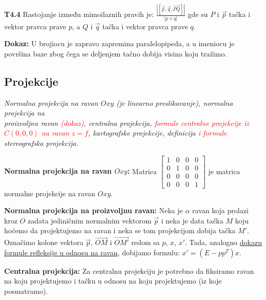 \documentclass[12pt]{article}
\newcommand{\vek}[1]{\overrightarrow{#1}}
\newcommand{\ocena}[1]{\textcolor{red}{#1}}
\begin{document}
\textbf{T4.4} Rastojanje između mimoilaznih pravih je:
$\frac{|[\vek{p},\vek{q},\vek{PQ}]|}{|p\times q|}$ gde su $P$ i $\vek{p}$ tačka
i vektor pravca prave $p$, a $Q$ i $\vek{q}$ tačka i vektor pravca prave $q$.
\par
\textbf{Dokaz:} U brojiocu je zapravo zapremina paralelopipeda, a u imeniocu je
površina baze zbog čega se deljenjem tačno dobija visina koju tražimo.
\par

\subsection{Projekcije}
\textit{Normalna projekcija na ravan $Oxy$ (je linearno preslikavanje),
    normalna projekcija na\\proizvoljnu ravan \ocena{(dokaz)}, centralna projekcija, \ocena{formule
        centralne projekcije iz $C(0,0,0)$ na ravan $z=f$}, kartografske projekcije,
    definicija \ocena{i formule} stereografska projekcija.}
\par
\vspace*{1cm}

\textbf{Normalna projekcija na ravan $Oxy$:} Matrica $\begin{bmatrix}
        1 & 0 & 0 & 0 \\
        0 & 1 & 0 & 0 \\
        0 & 0 & 0 & 0 \\
        0 & 0 & 0 & 1
    \end{bmatrix}$ je matrica normalne projekcije na ravan $Oxy$.
\par

\textbf{Normalna projekcija na proizvoljnu ravan:} Neka je $\alpha$ ravan koja
prolazi kroz $O$ zadata jediničnim normalnim vektorom $\vek{p}$ i neka je data
tačka $M$ koju hoćemo da projektujemo na ravan i neka se tom projekcijom dobija
tačka $M'$. Označimo kolone vektora $\vek{p}$, $\vek{OM}$ i $\vek{OM'}$ redom
sa $p$, $x$, $x'$. Tada, analogno \hyperref[refleksija_u_odnosu_na_ravan]
{dokazu formule refleksije u odnosu na ravan},
dobijamo formulu: $x'=(E-pp^T)x$.
\par

\textbf{Centralna projekcija:} Za centralnu projekciju je potrebno da fiksiramo
ravan na koju projektujemo i tačku u odnosu na koju projektujemo (iz koje
posmatramo).
\par
\end{document}

